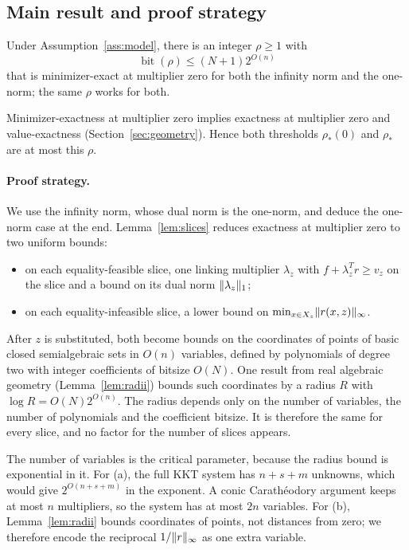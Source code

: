 \subsection{Main result and proof strategy}
\begin{theorem}\label{thm:generalupper}
Under Assumption~\ref{ass:model}, there is an integer $\rho\ge1$ with
\begin{equation}\label{eq:generalbits}
 \operatorname{bit}(\rho)\le (N+1)2^{O(n)}
\end{equation}
that is minimizer-exact at multiplier zero for both the infinity norm
and the one-norm; the same $\rho$ works for both.
\end{theorem}
Minimizer-exactness at multiplier zero implies exactness at multiplier
zero and value-exactness (Section~\ref{sec:geometry}). Hence both
thresholds $\rho_*(0)$ and $\rho_*$ are at most this $\rho$.

\paragraph{Proof strategy.}
We use the infinity norm, whose dual norm is the one-norm, and deduce
the one-norm case at the end. Lemma~\ref{lem:slices} reduces exactness
at multiplier zero to two uniform bounds:
\begin{itemize}
\item[(a)] on each equality-feasible slice, one linking multiplier
 $\lambda_z$ with $f+\lambda_z^Tr\ge v_z$ on the slice and a bound on
 its dual norm $\lVert\lambda_z\rVert_1$;
\item[(b)] on each equality-infeasible slice, a lower bound on
 $\min_{x\in X_z}\lVert r(x,z)\rVert_\infty$.
\end{itemize}
After $z$ is substituted, both become bounds on the coordinates of
points of basic closed semialgebraic sets in $O(n)$ variables, defined
by polynomials of degree two with integer coefficients of bitsize $O(N)$.
One result from real algebraic geometry (Lemma~\ref{lem:radii}) bounds
such coordinates by a radius $R$ with $\log R=O(N)2^{O(n)}$. The radius
depends only on the number of variables, the number of polynomials and
the coefficient bitsize. It is therefore the same for every slice, and
no factor for the number of slices appears.

The number of variables is the critical parameter, because the radius
bound is exponential in it. For (a), the full KKT system has $n+s+m$
unknowns, which would give $2^{O(n+s+m)}$ in the exponent. A conic
Carath\'eodory argument keeps at most $n$ multipliers, so the system has
at most $2n$ variables. For (b), Lemma~\ref{lem:radii} bounds coordinates
of points, not distances from zero; we therefore encode the reciprocal
$1/\lVert r\rVert_\infty$ as one extra variable.

